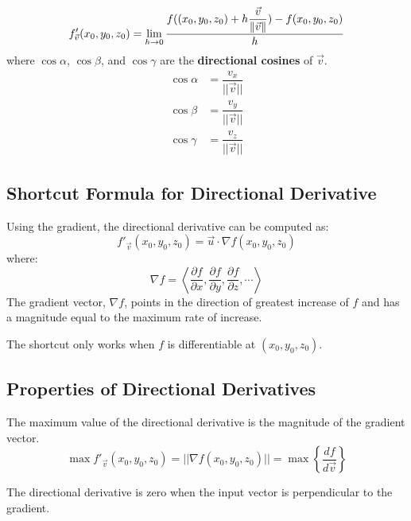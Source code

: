 \begin{equation}\label{Directional Derivative at a Point Definition}
    f'_{\vec{v}}(x_0, y_0, z_0) = 
    \lim_{h \to 0}
    \dfrac{
        f((x_0, y_0, z_0) + h\dfrac{\vec{v}}{\left\Vert\vec{v}\right\Vert}) - f(x_0, y_0, z_0)
    }{h}
\end{equation}
where \(\cos \alpha\), \(\cos \beta\), and \(\cos \gamma\) are the \textbf{directional cosines} of \(\vec{v}\).
\begin{align*}
    \cos \alpha &= \dfrac{v_x}{||\vec{v}||} \\
    \cos \beta &= \dfrac{v_y}{||\vec{v}||} \\
    \cos \gamma &= \dfrac{v_z}{||\vec{v}||}
\end{align*}
\subsection{Shortcut Formula for Directional Derivative}
Using the gradient, the directional derivative can be computed as:
\begin{equation}\label{Directional Derivative Shortcut}
    f'_{\vec{v}}(x_0, y_0, z_0) = \vec{u} \cdot \nabla f(x_0, y_0, z_0)
\end{equation}
where:
\begin{equation}\label{Gradient Definition}
    \nabla f = \left\langle \dfrac{\partial f}{\partial x}, \dfrac{\partial f}{\partial y}, \dfrac{\partial f}{\partial z}, \cdots \right\rangle
\end{equation}
The gradient vector, \(\nabla f\), points in the direction of greatest increase of \(f\) and has a magnitude equal to the maximum rate of increase.

The shortcut only works when $f$ is differentiable at $(x_0, y_0, z_0)$.

\subsection{Properties of Directional Derivatives}
The maximum value of the directional derivative is the magnitude of the gradient vector.
\begin{equation} \label{Maximum Value of Directional Derivative}
    \max f'_{\vec{v}}(x_0, y_0, z_0) = ||\nabla f(x_0, y_0, z_0)|| = \max \left\{ \dfrac{df}{d\vec{v}} \right\}
\end{equation}

The directional derivative is zero when the input vector is perpendicular to the gradient.


